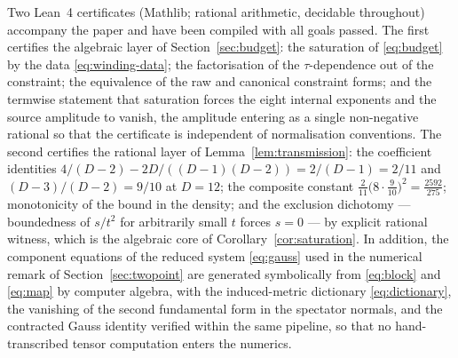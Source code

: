 \documentclass[11pt]{article}
\numberwithin{equation}{section}
\theoremstyle{plain}
\theoremstyle{definition}
\theoremstyle{remark}
\begin{document}
Two Lean~4 certificates (Mathlib; rational arithmetic, decidable
throughout) accompany the paper and have been compiled with all goals
passed. The first certifies the algebraic layer of
Section~\ref{sec:budget}: the saturation of \eqref{eq:budget} by the
data \eqref{eq:winding-data}; the factorisation of the
$\tau$-dependence out of the constraint; the equivalence of the raw
and canonical constraint forms; and the termwise statement that
saturation forces the eight internal exponents and the source
amplitude to vanish, the amplitude entering as a single non-negative
rational so that the certificate is independent of normalisation
conventions. The second certifies the rational layer of
Lemma~\ref{lem:transmission}: the coefficient identities
$4/(D-2) - 2D/((D-1)(D-2)) = 2/(D-1) = 2/11$ and
$(D-3)/(D-2) = 9/10$ at $D = 12$; the composite constant
$\tfrac{2}{11}\bigl(8\cdot\tfrac{9}{10}\bigr)^{2} =
\tfrac{2592}{275}$; monotonicity of the bound in the density; and the
exclusion dichotomy --- boundedness of $s/t^{2}$ for arbitrarily
small $t$ forces $s = 0$ --- by explicit rational witness, which is
the algebraic core of Corollary~\ref{cor:saturation}. In addition,
the component equations of the reduced system \eqref{eq:gauss} used in
the numerical remark of Section~\ref{sec:twopoint} are generated
symbolically from \eqref{eq:block} and \eqref{eq:map} by computer
algebra, with the induced-metric dictionary \eqref{eq:dictionary},
the vanishing of the second fundamental form in the spectator
normals, and the contracted Gauss identity verified within the same
pipeline, so that no hand-transcribed tensor computation enters the
numerics.
\end{document}

